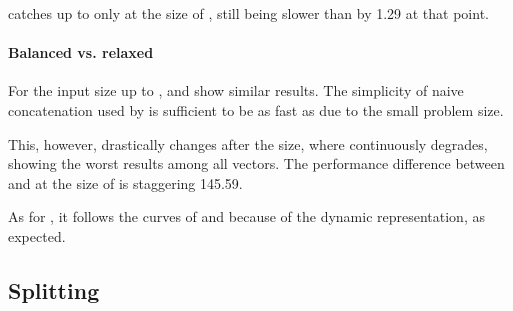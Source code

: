 \imrsvec{} catches up to \stdvec{} only at the size of , still being slower than \rrbvec{} by 1.29 at that point.

\paragraph{Balanced vs. relaxed}
For the input size up to , \rbvec{} and \rrbvec{} show similar results. The simplicity of naive concatenation used by \rbvec{} is sufficient to be as fast as \rrbvec{} due to the small problem size.

This, however, drastically changes after the  size, where \rbvec{} continuously degrades, showing the worst results among all vectors. The performance difference between \rbvec{} and \rrbvec{} at the size of  is staggering 145.59.

As for \pvec{}, it follows the curves of \stdvec{} and \rrbvec{} because of the dynamic representation, as expected.

\subsection{Splitting}

